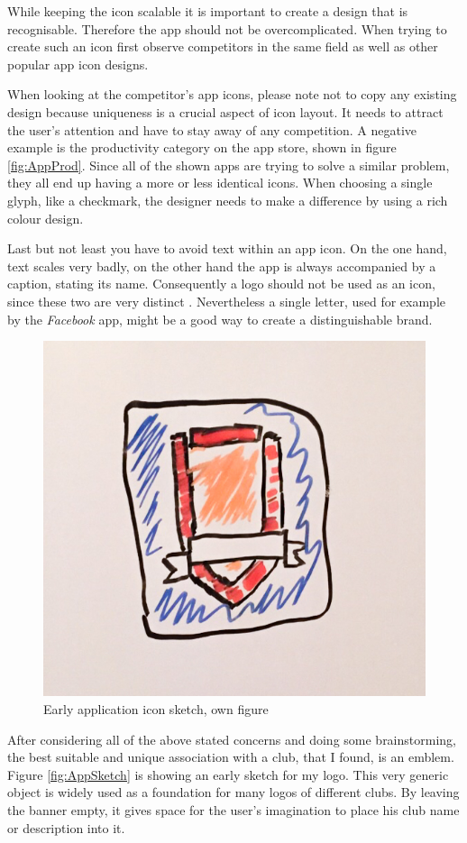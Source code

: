 While keeping the icon scalable it is important to create a design that is recognisable. Therefore the app should not be overcomplicated. When trying to create such an icon first observe competitors in the same field as well as other popular app icon designs. \cite{Flarup:2015aa}

When looking at the competitor's app icons, please note not to copy any existing design because uniqueness is a crucial aspect of icon layout. It needs to attract the user's attention and have to stay away of any competition. A negative example is the productivity category on the app store, shown in figure \vref{fig:AppProd}. Since all of the shown apps are trying to solve a similar problem, they all end up having a more or less identical icons. When choosing a single glyph, like a checkmark, the designer needs to make a difference by using a rich colour design. \cite{Flarup:2015aa}

Last but not least you have to avoid text within an app icon. On the one hand, text scales very badly, on the other hand the app is always accompanied by a caption, stating its name. Consequently a logo should not be used as an icon, since these two are very distinct \cite{Flarup:2015ab}. Nevertheless a single letter, used for example by the \emph{Facebook} app, might be a good way to create a distinguishable brand.

\begin{figure}[h]
  	\centering
  	\includegraphics[width=0.5\linewidth]{./images/app-sketch.jpg}
  	\caption{Early application icon sketch, own figure}
	\label{fig:AppSketch}
\end{figure}

After considering all of the above stated concerns and doing some brainstorming, the best suitable and unique association with a club, that I found, is an emblem. Figure \vref{fig:AppSketch} is showing an early sketch for my logo. This very generic object is widely used as a foundation for many logos of different clubs. By leaving the banner empty, it gives space for the user's imagination to place his club name or description into it. 

